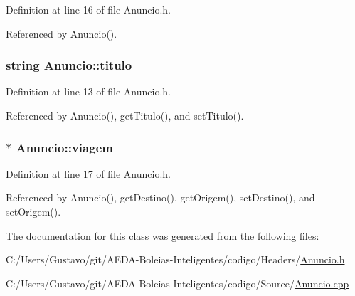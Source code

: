 Definition at line 16 of file Anuncio.\+h.



Referenced by Anuncio().

\hypertarget{class_anuncio_adb34bedd8220f42b9ee37662c21313e6}{
\subsubsection[{titulo}]{\setlength{\rightskip}{0pt plus 5cm}string Anuncio\+::titulo\hspace{0.3cm}{\ttfamily [private]}}}\label{class_anuncio_adb34bedd8220f42b9ee37662c21313e6}


Definition at line 13 of file Anuncio.\+h.



Referenced by Anuncio(), get\+Titulo(), and set\+Titulo().

\hypertarget{class_anuncio_aa225374a19420f56f5abc258d96b691a}{
\subsubsection[{viagem}]{$\ast$ Anuncio\+::viagem\hspace{0.3cm}{\ttfamily [private]}}}\label{class_anuncio_aa225374a19420f56f5abc258d96b691a}


Definition at line 17 of file Anuncio.\+h.



Referenced by Anuncio(), get\+Destino(), get\+Origem(), set\+Destino(), and set\+Origem().



The documentation for this class was generated from the following files\+:\begin{DoxyCompactItemize}
\item 
C\+:/\+Users/\+Gustavo/git/\+A\+E\+D\+A-\/\+Boleias-\/\+Inteligentes/codigo/\+Headers/\hyperlink{_anuncio_8h}{Anuncio.\+h}\item 
C\+:/\+Users/\+Gustavo/git/\+A\+E\+D\+A-\/\+Boleias-\/\+Inteligentes/codigo/\+Source/\hyperlink{_anuncio_8cpp}{Anuncio.\+cpp}\end{DoxyCompactItemize}
